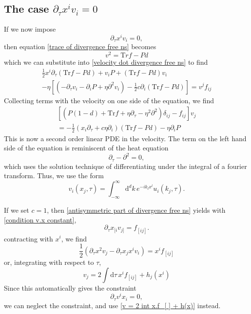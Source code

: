 \documentclass[12pt,a4paper]{article}
\newcommand{\ud}{\mathrm{d}}
\newcommand{\Tr}{\mathrm{Tr}}
\begin{document}
\subsection*{The case $\partial_\tau x^i v_i = 0$}

If we now impose
\begin{equation}
\partial_\tau x^i v_i = 0		,
\label{condition v.x constant}
\end{equation}
then equation \eqref{trace of divergence free ns} becomes
\begin{equation}
v^2		=		\mathrm Tr f		-		P d
\end{equation}
which we can substitute into \eqref{velocity dot divergence free ns} to find
\begin{multline}
\frac{1}{2} x^i \partial_\tau (\Tr f - P d )		+		v_i P		+		(\Tr f - P d ) v_i
\\
-		\eta
		\left[
			( - \partial_\tau v_i		-		\partial_i P		+		\eta \partial^2 v_i )		-		\frac{1}{2} c \partial_i (\Tr f - P d )
		\right]
	=		v^j f_{ij}
\end{multline}
Collecting terms with the velocity on one side of the equation, we find
\begin{multline}
\left[
	( P (1 - d)		+		\Tr f		+		\eta \partial_\tau		-		\eta^2 \partial^2 ) \delta_{ij}		-		f_{ij}
\right]
v_j
\\
=		-		\frac{1}{2} ( x_i \partial_\tau		+		c \eta \partial_i ) ( \Tr f		-		Pd )		-		\eta \partial_i P
\end{multline}
This is now a second order linear PDE in the velocity. The term on the left hand side of the equation is reminiscent of the heat equation
\begin{equation}
\partial_\tau		-		\partial^2		=		0		,
\end{equation}
which uses the solution technique of differentiating under the integral of a fourier transform. Thus, we use the form
\begin{equation}
v_i (x_j, \tau)		=		\int_{-\infty}^\infty \ud^d k \,		e^{ - i k_l x^l }		u_i(k_j, \tau)		.
\end{equation}

If we set $c=1$, then \eqref{antisymmetric part of divergence free ns} yields with \eqref{condition v.x constant},
\begin{equation}
\partial_\tau x_{ [i } v_{ j] }		=		f_{ [ij] }		.
\end{equation}
contracting with $x^i$, we find
\begin{equation}
\frac{1}{2} (\partial_\tau x^2 v_j - \partial_\tau x_j x^iv_i)		= x^i f_{[ij]}
\end{equation}
or, integrating with respect to $\tau$,
\begin{equation}
v_j		=		2 \int \ud\tau \, x^i f_{[ij]}		+		h_j (x^i)
\label{v = 2 int x.f_[ ]  + h(x)}
\end{equation}
Since this automatically gives the constraint
\begin{equation}
\partial_\tau v^i x_i =0,
\end{equation}
we can neglect the constraint, and use \eqref{v = 2 int x.f_[ ]  + h(x)} instead.
\end{document}
